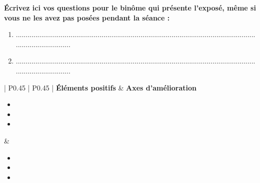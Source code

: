 \documentclass[oneside,12pt]{exam}          %
\begin{document}
\bigskip

\textbf{Écrivez ici vos questions pour le binôme qui présente l'exposé, même si vous ne les avez pas posées pendant la séance :}

\begin{enumerate}[itemsep = 5mm]
	\item .......................................................................................................................................................
	\item .......................................................................................................................................................
\end{enumerate}

\bigskip

\begin{center}
	\renewcommand{\arraystretch}{1.5}
	\begin{tabular}{| P{0.45\textwidth} | P{0.45\textwidth} | } \hline
		\textbf{Éléments positifs} & \textbf{Axes d'amélioration} \\ \hline
		\begin{itemize}[label = $\bullet$ , itemsep = 8mm]
			\item
			\item
			\item
		\end{itemize} \vspace{5mm}
	&
		\begin{itemize}[label = $\bullet$ , itemsep = 8mm]
			\item
			\item
			\item
		\end{itemize} \vspace{5mm} \\ \hline
	\end{tabular} 
\end{center}

	
\end{document}
